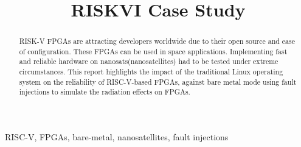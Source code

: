 \documentclass[conference]{IEEEtran}
\begin{document}
\title{RISKVI Case Study\\}
\author{
}
\maketitle

\begin{abstract}
RISK-V FPGAs are attracting developers worldwide due to their open source and 
ease of configuration. These FPGAs can be used in space applications. Implementing fast and reliable 
hardware on nanosats(nanosatellites) had to be tested under extreme circumstances. This report highlights the
impact of the traditional Linux operating system on the reliability of RISC-V-based FPGAs, against bare metal mode 
using fault injections to simulate the radiation effects on FPGAs. 
\end{abstract}
\begin{IEEEkeywords}
RISC-V, FPGAs, bare-metal, nanosatellites, fault injections
\end{IEEEkeywords}

\end{document}
